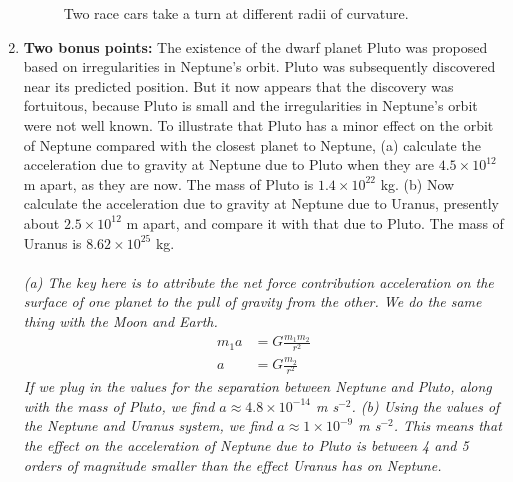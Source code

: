 \documentclass[10pt]{article}
\begin{document}
\begin{enumerate}
\begin{figure}[ht]
\caption{\label{fig:race} Two race cars take a turn at different radii of curvature.}
\end{figure}
\item \textbf{Two bonus points:} The existence of the dwarf planet Pluto was proposed based on irregularities in Neptune’s orbit. Pluto was subsequently discovered near its predicted position. But it now appears that the discovery was fortuitous, because Pluto is small and the irregularities in Neptune’s orbit were not well known. To illustrate that Pluto has a minor effect on the orbit of Neptune compared with the closest planet to Neptune, (a) calculate the acceleration due to gravity at Neptune due to Pluto when they are $4.5 \times 10^{12}$ m apart, as they are now.  The mass of Pluto is $1.4 \times 10^{22}$ kg.  (b) Now calculate the acceleration due to gravity at Neptune due to Uranus, presently about $2.5 \times 10^{12}$ m apart, and compare it with that due to Pluto.  The mass of Uranus is $8.62 \times 10^{25}$ kg. \\ \\
\textit{(a) The key here is to attribute the net force contribution acceleration on the surface of one planet to the pull of gravity from the other.  We do the same thing with the Moon and Earth.}
\begin{align}
m_1 a &= G \frac{m_1 m_2}{r^2} \\
a &= G \frac{m_2}{r^2}
\end{align}
\textit{If we plug in the values for the separation between Neptune and Pluto, along with the mass of Pluto, we find $a \approx 4.8 \times 10^{-14}$ m s$^{-2}$. (b) Using the values of the Neptune and Uranus system, we find $a \approx 1 \times 10^{-9}$ m s$^{-2}$.  This means that the effect on the acceleration of Neptune due to Pluto is between 4 and 5 orders of magnitude smaller than the effect Uranus has on Neptune.}
\end{enumerate}
\end{document}
